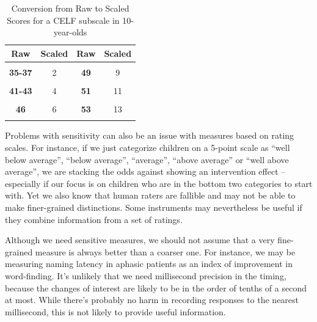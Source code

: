 \documentclass{krantz}
\begin{document}
\begin{table}

\caption{\label{tab:celfexample}Conversion from Raw to Scaled Scores for a CELF subscale in 10-year-olds}
\centering
\begin{tabular}[t]{>{}cc>{}cc}
\toprule
Raw & Scaled & Raw & Scaled\\
\midrule
\textbf{\cellcolor{gray!6}{0-34}} & \cellcolor{gray!6}{1} & \textbf{\cellcolor{gray!6}{48}} & \cellcolor{gray!6}{8}\\
\textbf{35-37} & 2 & \textbf{49} & 9\\
\textbf{\cellcolor{gray!6}{38-40}} & \cellcolor{gray!6}{3} & \textbf{\cellcolor{gray!6}{50}} & \cellcolor{gray!6}{10}\\
\textbf{41-43} & 4 & \textbf{51} & 11\\
\textbf{\cellcolor{gray!6}{44-45}} & \cellcolor{gray!6}{5} & \textbf{\cellcolor{gray!6}{52}} & \cellcolor{gray!6}{12}\\
\addlinespace
\textbf{46} & 6 & \textbf{53} & 13\\
\textbf{\cellcolor{gray!6}{47}} & \cellcolor{gray!6}{7} & \textbf{\cellcolor{gray!6}{54}} & \cellcolor{gray!6}{14}\\
\bottomrule
\end{tabular}
\end{table}

Problems with sensitivity can also be an issue with measures based on rating scales. For instance, if we just categorize children on a 5-point scale as ``well below average'', ``below average'', ``average'', ``above average'' or ``well above average'', we are stacking the odds against showing an intervention effect -- especially if our focus is on children who are in the bottom two categories to start with. Yet we also know that human raters are fallible and may not be able to make finer-grained distinctions. Some instruments may nevertheless be useful if they combine information from a set of ratings.

Although we need sensitive measures, we should not assume that a very fine-grained measure is always better than a coarser one. For instance, we may be measuring naming latency in aphasic patients as an index of improvement in word-finding. It's unlikely that we need millisecond precision in the timing, because the changes of interest are likely to be in the order of tenths of a second at most. While there's probably no harm in recording responses to the nearest millisecond, this is not likely to provide useful information.
\end{document}
